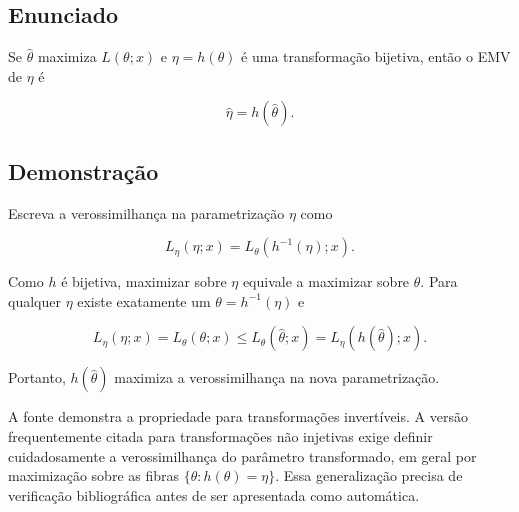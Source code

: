 \documentclass[
  letterpaper,
  DIV=11,
  numbers=noendperiod]{scrreprt}
\begin{document}
\subsection*{Enunciado}\label{enunciado-9}

Se \(\widehat\theta\) maximiza \(L(\theta;x)\) e \(\eta=h(\theta)\) é
uma transformação bijetiva, então o EMV de \(\eta\) é

\[
\widehat\eta=h(\widehat\theta).
\]

\subsection*{Demonstração}\label{demonstrauxe7uxe3o-10}

Escreva a verossimilhança na parametrização \(\eta\) como

\[
L_\eta(\eta;x)
=
L_\theta(h^{-1}(\eta);x).
\]

Como \(h\) é bijetiva, maximizar sobre \(\eta\) equivale a maximizar
sobre \(\theta\). Para qualquer \(\eta\) existe exatamente um
\(\theta=h^{-1}(\eta)\) e

\[
L_\eta(\eta;x)
=
L_\theta(\theta;x)
\leq
L_\theta(\widehat\theta;x)
=
L_\eta(h(\widehat\theta);x).
\]

Portanto, \(h(\widehat\theta)\) maximiza a verossimilhança na nova
parametrização.

\begin{tcolorbox}[enhanced jigsaw, colback=white, leftrule=.75mm, colbacktitle=quarto-callout-warning-color!10!white, breakable, titlerule=0mm, bottomtitle=1mm, title=\textcolor{quarto-callout-warning-color}{\faExclamationTriangle}\hspace{0.5em}{Transformações não injetivas}, colframe=quarto-callout-warning-color-frame, toprule=.15mm, opacityback=0, bottomrule=.15mm, opacitybacktitle=0.6, arc=.35mm, toptitle=1mm, rightrule=.15mm, coltitle=black, left=2mm]

A fonte demonstra a propriedade para transformações invertíveis. A
versão frequentemente citada para transformações não injetivas exige
definir cuidadosamente a verossimilhança do parâmetro transformado, em
geral por maximização sobre as fibras \(\{\theta:h(\theta)=\eta\}\).
Essa generalização precisa de verificação bibliográfica antes de ser
apresentada como automática.

\end{tcolorbox}
\end{document}
